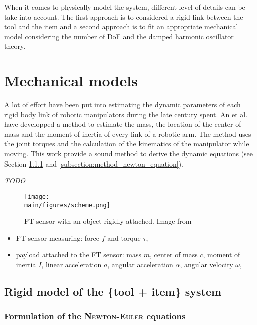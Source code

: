 \documentclass[/home/francois/latex/report/main.tex]{subfiles}
\begin{document}
When it comes to physically model the system, different level of details can be take into account. The first approach is to considered a rigid link between the tool and the item and a second approach is to fit an appropriate mechanical model considering the number of \ac{DoF} and the damped harmonic oscillator theory.


\section{Mechanical models}
\label{section:mechanical-models}

A lot of effort have been put into estimating the dynamic parameters of each rigid body link of robotic manipulators during the late century spent. An et al. \cite{An1985} have developped a method to estimate the mass, the location of the center of mass and the moment of inertia of every link of a robotic arm. The method uses the joint torques and the calculation of the kinematics of the manipulator while moving. This work provide a sound method to derive the dynamic equations (see Section \ref{subsubsection:background_newton_equation} and \ref{subsection:method_newton_equation}).

\textit{TODO}

\begin{figure}
  \centering
  \texttt{[image: \\main/figures/scheme.png]}
  \caption{\ac{FT} sensor with an object rigidly attached. Image from \cite{Kubus2007}}
\end{figure}

\begin{itemize}
 \item \ac{FT} sensor measuring: force $f$ and torque $\tau$,
 \item payload attached to the \ac{FT} sensor: mass $m$, center of mass $c$, moment of inertia $I$, linear acceleration $a$, angular acceleration $\alpha$, angular velocity $\omega$,
\end{itemize}

\subsection{Rigid model of the \{tool + item\} system}

\subsubsection{Formulation of the \textsc{Newton-Euler} equations}
\label{subsubsection:background_newton_equation}
\end{document}
